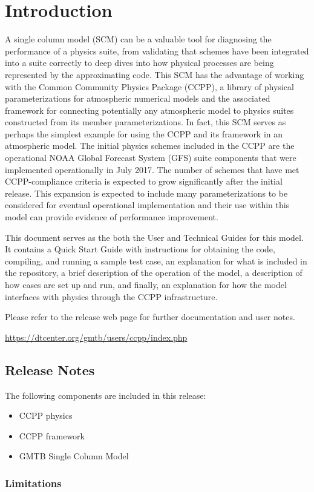 \chapter{Introduction}
\label{chapter: introduction}
\setlength{\parskip}{12pt}

A single column model (SCM) can be a valuable tool for diagnosing the performance of a physics suite, from validating that schemes have been integrated into a suite correctly to deep dives into how physical processes are being represented by the approximating code. This SCM has the advantage of working with the Common Community Physics Package (CCPP), a library of physical parameterizations for atmospheric numerical models and the associated framework for connecting potentially any atmospheric model to physics suites constructed from its member parameterizations. In fact, this SCM serves as perhaps the simplest example for using the CCPP and its framework in an atmospheric model. The initial physics schemes included in the CCPP are the operational NOAA Global Forecast System (GFS) suite components that were implemented operationally in July 2017. The number of schemes that have met CCPP-compliance criteria is expected to grow significantly after the initial release. This expansion is expected to include many parameterizations to be considered for eventual operational implementation and their use within this model can provide evidence of performance improvement.

This document serves as the both the User and Technical Guides for this model. It contains a Quick Start Guide with instructions for obtaining the code, compiling, and running a sample test case, an explanation for what is included in the repository, a brief description of the operation of the model, a description of how cases are set up and run, and finally, an explanation for how the model interfaces with physics through the CCPP infrastructure.

Please refer to the release web page for further documentation and user notes.

\url{https://dtcenter.org/gmtb/users/ccpp/index.php}

\section{Release Notes}

The following components are included in this release:

\begin{itemize}
	\item CCPP physics
	\item CCPP framework
	\item GMTB Single Column Model
\end{itemize}

\subsection{Limitations}

